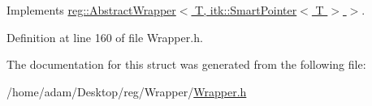 Implements \hyperlink{structreg_1_1_abstract_wrapper_af017f2af039fd5b940345e930e4bb397}{reg\+::\+Abstract\+Wrapper$<$ T, itk\+::\+Smart\+Pointer$<$ T $>$ $>$}.



Definition at line 160 of file Wrapper.\+h.



The documentation for this struct was generated from the following file\+:\begin{DoxyCompactItemize}
\item 
/home/adam/\+Desktop/reg/\+Wrapper/\hyperlink{_wrapper_8h}{Wrapper.\+h}\end{DoxyCompactItemize}
